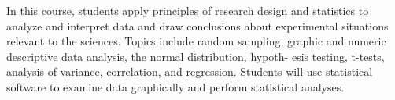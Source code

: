 In this course, students apply principles of research design and statistics to analyze and interpret data and draw conclusions about experimental situations relevant to the sciences. Topics include random sampling, graphic and numeric descriptive data analysis, the normal distribution, hypoth- esis testing, t-tests, analysis of variance, correlation, and regression. Students will use statistical software to examine data graphically and perform statistical analyses.






